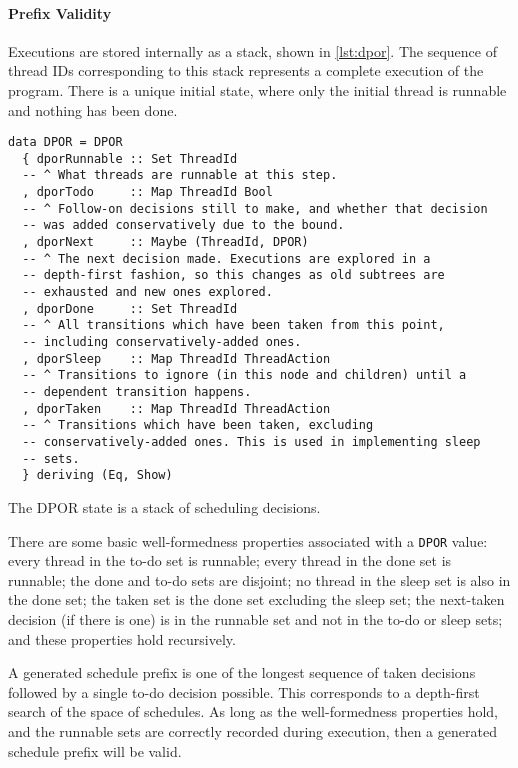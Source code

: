 \paragraph{Prefix Validity}
Executions are stored internally as a stack, shown in \cref{lst:dpor}.
The sequence of thread IDs corresponding to this stack represents a
complete execution of the program.  There is a unique initial state,
where only the initial thread is runnable and nothing has been done.

\begin{listing}
  \begin{verbatim}
data DPOR = DPOR
  { dporRunnable :: Set ThreadId
  -- ^ What threads are runnable at this step.
  , dporTodo     :: Map ThreadId Bool
  -- ^ Follow-on decisions still to make, and whether that decision
  -- was added conservatively due to the bound.
  , dporNext     :: Maybe (ThreadId, DPOR)
  -- ^ The next decision made. Executions are explored in a
  -- depth-first fashion, so this changes as old subtrees are
  -- exhausted and new ones explored.
  , dporDone     :: Set ThreadId
  -- ^ All transitions which have been taken from this point,
  -- including conservatively-added ones.
  , dporSleep    :: Map ThreadId ThreadAction
  -- ^ Transitions to ignore (in this node and children) until a
  -- dependent transition happens.
  , dporTaken    :: Map ThreadId ThreadAction
  -- ^ Transitions which have been taken, excluding
  -- conservatively-added ones. This is used in implementing sleep
  -- sets.
  } deriving (Eq, Show)
  \end{verbatim}
  \caption[The \dejafu{} DPOR state.]{The DPOR state is a stack of scheduling decisions.}\label{lst:dpor}
\end{listing}

There are some basic well-formedness properties associated with a
\verb|DPOR| value: every thread in the to-do set is runnable; every
thread in the done set is runnable; the done and to-do sets are
disjoint; no thread in the sleep set is also in the done set; the
taken set is the done set excluding the sleep set; the next-taken
decision (if there is one) is in the runnable set and not in the to-do
or sleep sets; and these properties hold recursively.

A generated schedule prefix is one of the longest sequence of taken
decisions followed by a single to-do decision possible.  This
corresponds to a depth-first search of the space of schedules.  As
long as the well-formedness properties hold, and the runnable sets are
correctly recorded during execution, then a generated schedule prefix
will be valid.

